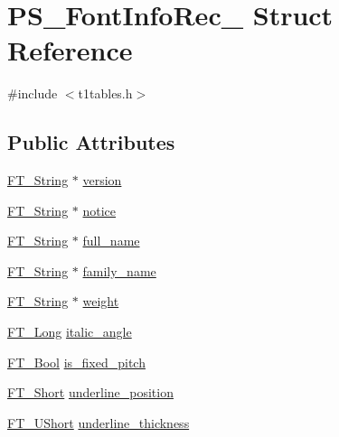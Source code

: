 \hypertarget{struct_p_s___font_info_rec__}{\section{P\-S\-\_\-\-Font\-Info\-Rec\-\_\- Struct Reference}
\label{struct_p_s___font_info_rec__}
}


{\ttfamily \#include $<$t1tables.\-h$>$}

\subsection*{Public Attributes}
\begin{DoxyCompactItemize}
\item 
\hyperlink{fttypes_8h_a9846214585359eb2ba6bbb0e6de30639}{F\-T\-\_\-\-String} $\ast$ \hyperlink{struct_p_s___font_info_rec___adb595076e50f8e7ece9446f612433cfc}{version}
\item 
\hyperlink{fttypes_8h_a9846214585359eb2ba6bbb0e6de30639}{F\-T\-\_\-\-String} $\ast$ \hyperlink{struct_p_s___font_info_rec___a63858ebce653f21d9aa2ddc61ee32b80}{notice}
\item 
\hyperlink{fttypes_8h_a9846214585359eb2ba6bbb0e6de30639}{F\-T\-\_\-\-String} $\ast$ \hyperlink{struct_p_s___font_info_rec___a039dbf76ccc1b63b03e77215cb4b430b}{full\-\_\-name}
\item 
\hyperlink{fttypes_8h_a9846214585359eb2ba6bbb0e6de30639}{F\-T\-\_\-\-String} $\ast$ \hyperlink{struct_p_s___font_info_rec___ac54d883f153a495f9a20dc043ed434cf}{family\-\_\-name}
\item 
\hyperlink{fttypes_8h_a9846214585359eb2ba6bbb0e6de30639}{F\-T\-\_\-\-String} $\ast$ \hyperlink{struct_p_s___font_info_rec___a057243ec7cf62f573fa675ccb728f4b1}{weight}
\item 
\hyperlink{fttypes_8h_a7fa72a1f0e79fb1860c5965789024d6f}{F\-T\-\_\-\-Long} \hyperlink{struct_p_s___font_info_rec___ab558a75a56fadd54dfc71dcbeec1375a}{italic\-\_\-angle}
\item 
\hyperlink{fttypes_8h_a1a832a256bb5a7e6e884afaa1a07f3ae}{F\-T\-\_\-\-Bool} \hyperlink{struct_p_s___font_info_rec___a68e2d0913fe910ea86d558a4a426412a}{is\-\_\-fixed\-\_\-pitch}
\item 
\hyperlink{fttypes_8h_aa7279be89046a2563cd3d4d6651fbdcf}{F\-T\-\_\-\-Short} \hyperlink{struct_p_s___font_info_rec___a772af52d17288d7846e8893e74d55212}{underline\-\_\-position}
\item 
\hyperlink{fttypes_8h_a937f6c17cf5ffd09086d8610c37b9f58}{F\-T\-\_\-\-U\-Short} \hyperlink{struct_p_s___font_info_rec___a423904e811db5195485557bf0dccf126}{underline\-\_\-thickness}
\end{DoxyCompactItemize}


